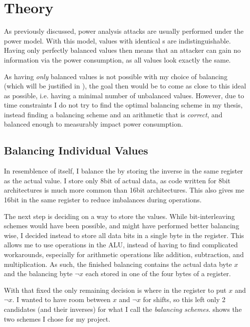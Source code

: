 \chapter{Theory}
\label{theory}
As previously discussed, power analysis attacks are usually performed under the \hammingw{} power model.
With this model, values with identical \hammingw{}s are indistinguishable.
Having only perfectly balanced values then means that an attacker can gain no information via the power consumption, as all values look exactly the same.

As having \emph{only} balanced values is not possible with my choice of balancing (which will be justified in ), the goal then would be to come as close to this ideal as possible, i.e. having a minimal number of unbalanced values.
However, due to time constraints I do not try to find the optimal balancing scheme in my thesis, instead finding a balancing scheme and an arithmetic that is \emph{correct}, and balanced enough to measurably impact power consumption.

\section{Balancing Individual Values}
\label{values}
In resemblence of \dual{} itself, I balance the \hammingw{} by storing the inverse in the same register as the actual value.
I store only 8bit of actual data, as code written for 8bit architectures is much more common than 16bit architectures.
This also gives me 16bit in the same register to reduce imbalances during operations.

The next step is deciding on a way to store the values.
While bit-interleaving schemes would have been possible, and might have performed better balancing wise, I decided instead to store all data bits in a single byte in the register.
This allows me to use operations in the ALU, instead of having to find complicated workarounds, especially for arithmetic operations like addition, subtraction, and multiplication.
As such, the finished balancing contains the actual data byte $x$ and the balancing byte $\neg{x}$ each stored in one of the four bytes of a register.

With that fixed the only remaining decision is where in the register to put $x$ and $\neg{x}$.
I wanted to have room between $x$ and $\neg{x}$ for shifts, so this left only 2 candidates (and their inverses) for what I call the \emph{balancing schemes}.
 shows the two schemes I chose for my project.

